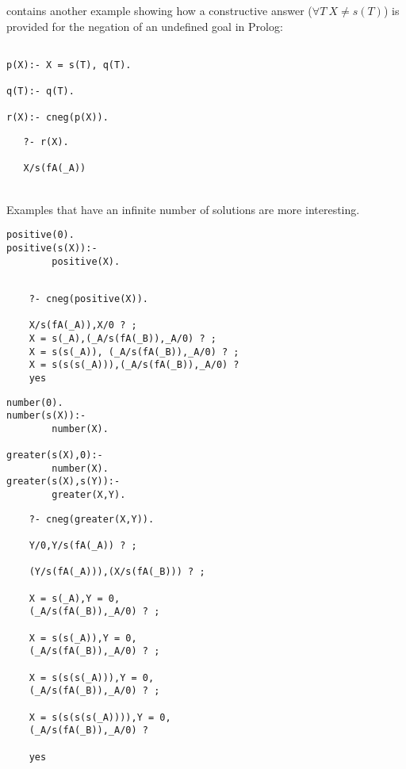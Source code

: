 \documentclass{llncs}
\begin{document}
\cite{Stuckey95} contains another example showing how a constructive
answer ($\forall T ~ X \neq s(T)$) is provided for the negation of an
undefined goal in Prolog:

\begin{minipage}{2in}
\begin{verbatim}

p(X):- X = s(T), q(T).

q(T):- q(T).

r(X):- cneg(p(X)).
\end{verbatim}
\end{minipage}
\begin{minipage}{2in}
\begin{verbatim} 
   ?- r(X).

   X/s(fA(_A))

\end{verbatim} 
\end{minipage}\\



Examples that have an infinite number of solutions are more
interesting.

\begin{minipage}{1.5in}
\begin{verbatim}
positive(0). 
positive(s(X)):-
        positive(X).  
\end{verbatim}
\end{minipage} 
\begin{minipage}{2.5in}
\begin{verbatim} 

    ?- cneg(positive(X)).

    X/s(fA(_A)),X/0 ? ;
    X = s(_A),(_A/s(fA(_B)),_A/0) ? ;
    X = s(s(_A)), (_A/s(fA(_B)),_A/0) ? ;
    X = s(s(s(_A))),(_A/s(fA(_B)),_A/0) ? 
    yes
\end{verbatim} 
\end{minipage}

\begin{minipage}{1.5in}
\begin{verbatim}
number(0).
number(s(X)):-
        number(X).

greater(s(X),0):-
        number(X).
greater(s(X),s(Y)):-
        greater(X,Y).
\end{verbatim}
\end{minipage}
\begin{minipage}{2.5in}
\begin{verbatim} 
    ?- cneg(greater(X,Y)).

    Y/0,Y/s(fA(_A)) ? ;

    (Y/s(fA(_A))),(X/s(fA(_B))) ? ;

    X = s(_A),Y = 0,
    (_A/s(fA(_B)),_A/0) ? ;

    X = s(s(_A)),Y = 0,
    (_A/s(fA(_B)),_A/0) ? ;

    X = s(s(s(_A))),Y = 0,
    (_A/s(fA(_B)),_A/0) ? ;

    X = s(s(s(s(_A)))),Y = 0,
    (_A/s(fA(_B)),_A/0) ? 

    yes
\end{verbatim} 
\end{minipage}
\end{document}
